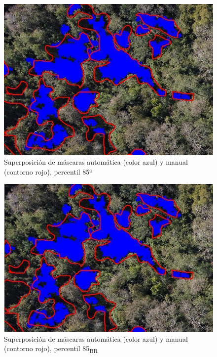 \begin{figure}[H]
         
         \includegraphics[width=\textwidth]{Imagenes/superposition of masks 2.png}
         \caption{Superposición de máscaras automática (color azul) y manual (contorno rojo), percentil 85º}
         \label{p85}
\end{figure}

\begin{figure}[H]
    
    \includegraphics[width=\textwidth]{Imagenes/blue minus red 85.png}
     \hfill
     \caption{Superposición de máscaras automática (color azul) y manual (contorno rojo), percentil 85\textpsi\textsubscript{BR}}
    \label{azulrojo}
 \end{figure}

